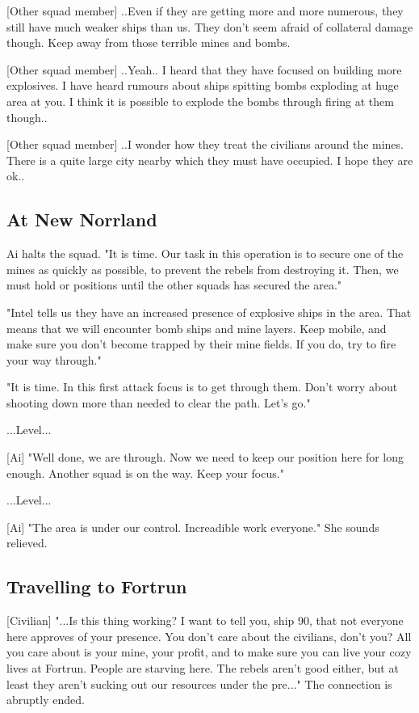 \documentclass[a4paper,12pt]{article}
\begin{document}
[Other squad member] ..Even if they are getting more and more numerous, they still have much
weaker ships than us. They don't seem afraid of collateral damage though. Keep away from those
terrible mines and bombs.

[Other squad member] ..Yeah.. I heard that they have focused on building more explosives.
I have heard rumours about ships spitting bombs exploding at huge area at you. I think
it is possible to explode the bombs through firing at them though..

[Other squad member] ..I wonder how they treat the civilians around the mines. There is a
quite large city nearby which they must have occupied. I hope they are ok..

\subsection{At New Norrland}

Ai halts the squad. "It is time. Our task in this operation is to secure one of the mines
as quickly as possible, to prevent the rebels from destroying it. Then, we must hold or positions
until the other squads has secured the area."

"Intel tells us they have an increased presence of explosive ships in the area. That means
that we will encounter bomb ships and mine layers. Keep mobile, and make sure you don't become
trapped by their mine fields. If you do, try to fire your way through."

"It is time. In this first attack focus is to get through them. Don't worry about shooting
down more than needed to clear the path. Let's go."

...Level...

[Ai] "Well done, we are through. Now we need to keep our position here for long enough.
Another squad is on the way. Keep your focus."

...Level...

[Ai] "The area is under our control. Increadible work everyone."
She sounds relieved.

\subsection{Travelling to Fortrun}

[Civilian] "...Is this thing working? I want to tell you, ship 90, that not everyone here
approves of your presence. You don't care about the civilians, don't you? All you care
about is your mine, your profit, and to make sure you can live your cozy lives at Fortrun.
People are starving here. The rebels aren't good either, but at least they aren't sucking
out our resources under the pre..." The connection is abruptly ended.
\end{document}
